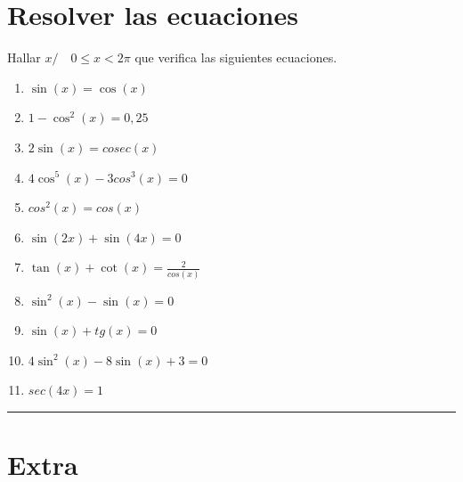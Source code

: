 \documentclass[a4paper,11pt,spanish,sans]{exam}
\begin{document}
\section{Resolver las ecuaciones }
\label{ecuaciones}
Hallar $x/ \quad 0\leq x < 2\pi$ que verifica las siguientes ecuaciones.

\begin{multicols}{2}%

\begin{enumerate}

	\item  $\sin (x) = \cos(x) $
	\item $1-\cos^2(x)=0,25$
	\item  $2\sin(x)=cosec(x)$
	\item $4\cos^5(x)-3cos^3(x)=0$
	\item  $ cos^2(x)=cos(x) $
	\item $\sin(2x)+\sin(4x)=0$

\columnbreak 

	\item $\tan (x)+\cot(x)=\frac{2}{cos(x)}$
	\item $\sin^2(x)-\sin(x)=0$
	\item  $ \sin(x)+tg(x)=0 $
	\item $4\sin^2(x)-8\sin(x)+3=0$
	\item $sec(4x)=1$

\end{enumerate}
\end{multicols}


\rule[2ex]{\textwidth}{2pt}


\section*{Extra}
\end{document}
